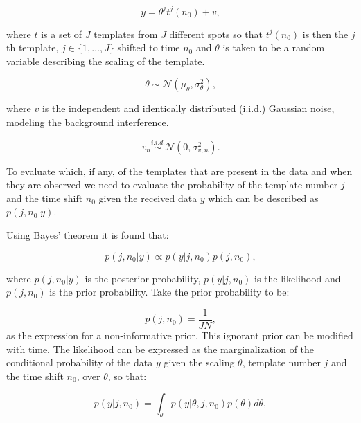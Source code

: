 \begin{equation}\label{eq:MLmod1}
y = \theta^j t^j(n_0) + v,
\end{equation}

where $t$ is a set of $J$ templates from $J$ different spots so that $t^j(n_0)$ is then the $j$th template, $j \in \{1, \ldots ,J\}$ shifted to time $n_0$ and $\theta$ is taken to be a random variable describing the scaling of the template.

\begin{equation}\label{eq:MLtheta}
\theta \sim \mathcal{N}(\mu_{\theta},\sigma_{\theta}^2),
\end{equation}

where $v$ is the independent and identically distributed (i.i.d.) Gaussian noise, modeling the background interference.

\begin{equation}\label{eq:MLnoise}
v_n \stackrel{i.i.d.}{\sim} \mathcal{N}(0,\sigma_{v,n}^2).
\end{equation}

To evaluate which, if any, of the templates that are present in the data and when they are observed we need to evaluate the probability of the template number $j$ and the time shift $n_0$ given the received data $y$ which can be described as $p(j,n_0|y)$.

Using Bayes' theorem it is found that:

\begin{equation}\label{eq:MLBayes}
p(j,n_0|y) \propto p(y|j,n_0)p(j,n_0),
\end{equation}

where $p(j,n_0|y)$ is the posterior probability, $p(y|j,n_0)$ is the likelihood and $p(j,n_0)$ is the prior probability.
Take the prior probability to be:

\begin{equation}\label{eq:MLPrior}
p(j,n_0) = \frac{1}{JN},
\end{equation}
as the expression for a non-informative prior. This ignorant prior can be modified with time.
The likelihood can be expressed as the marginalization of the conditional probability of the data $y$ given the scaling $\theta$, template number $j$ and the time shift $n_0$, over $\theta$, so that:

\begin{equation}\label{eq:MLmargin}
p(y|j,n_0)=\int_\theta p(y|\theta, j, n_0) p(\theta) d\theta,
\end{equation}

